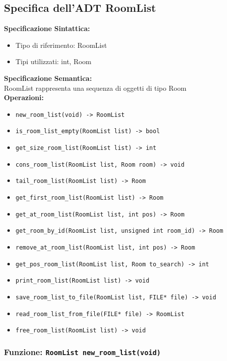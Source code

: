 \documentclass[11pt]{scrartcl} %
\begin{document}
\subsection{Specifica dell'ADT RoomList}

\textbf{Specificazione Sintattica:}
\begin{itemize}
	\item Tipo di riferimento: RoomList
	\item Tipi utilizzati: int, Room
\end{itemize}
\textbf{Specificazione Semantica:} \\
RoomList rappresenta una sequenza di oggetti di tipo Room\\

\textbf{Operazioni:}
\begin{itemize}
    \item \texttt{new\_room\_list(void) -> RoomList}
    \item \texttt{is\_room\_list\_empty(RoomList list) -> bool}
    \item \texttt{get\_size\_room\_list(RoomList list) -> int}
    \item \texttt{cons\_room\_list(RoomList list, Room room) -> void}
    \item \texttt{tail\_room\_list(RoomList list) -> Room}
    \item \texttt{get\_first\_room\_list(RoomList list) -> Room}
    \item \texttt{get\_at\_room\_list(RoomList list, int pos) -> Room}
    \item \texttt{get\_room\_by\_id(RoomList list, unsigned int room\_id) -> Room}
    \item \texttt{remove\_at\_room\_list(RoomList list, int pos) -> Room}
    \item \texttt{get\_pos\_room\_list(RoomList list, Room to\_search) -> int}
    \item \texttt{print\_room\_list(RoomList list) -> void}
    \item \texttt{save\_room\_list\_to\_file(RoomList list, FILE* file) -> void}
    \item \texttt{read\_room\_list\_from\_file(FILE* file) -> RoomList}
    \item \texttt{free\_room\_list(RoomList list) -> void}
\end{itemize}


\subsubsection{Funzione: \texttt{RoomList new\_room\_list(void)}}
\end{document}
